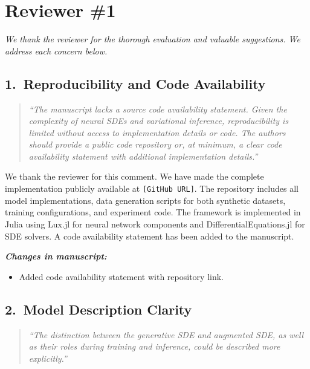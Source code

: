 \documentclass[12pt]{article}
\newcommand{\reviewercomment}[1]{%
  \begin{quote}
  \textcolor{reviewergray}{\textit{``#1''}}
  \end{quote}
}
\newcommand{\changes}{\vspace{0.3em}\noindent\textbf{\textit{Changes in manuscript:}}\vspace{0.2em}}
\begin{document}
\newpage

\section*{Reviewer \#1}

\textit{We thank the reviewer for the thorough evaluation and valuable suggestions. We address each concern below.}

\subsection*{1.\ Reproducibility and Code Availability}

\reviewercomment{The manuscript lacks a source code availability statement. Given the complexity of neural SDEs and variational inference, reproducibility is limited without access to implementation details or code. The authors should provide a public code repository or, at minimum, a clear code availability statement with additional implementation details.}

We thank the reviewer for this comment. We have made the complete implementation publicly available at \texttt{[GitHub URL]}. The repository includes all model implementations, data generation scripts for both synthetic datasets, training configurations, and experiment code. The framework is implemented in Julia using Lux.jl for neural network components and DifferentialEquations.jl for SDE solvers. A code availability statement has been added to the manuscript.

\changes
\begin{itemize}[leftmargin=2em]
\item Added code availability statement with repository link.
\end{itemize}

\subsection*{2.\ Model Description Clarity}

\reviewercomment{The distinction between the generative SDE and augmented SDE, as well as their roles during training and inference, could be described more explicitly.}
\end{document}
